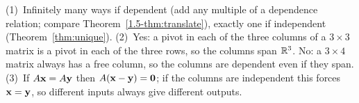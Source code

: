 \documentclass[11pt]{article}
\begin{document}
\begin{description}[leftmargin=0pt,itemsep=5pt]
  \item[Before the next section.] (1)~Infinitely many ways if dependent (add any multiple of a dependence relation; compare Theorem~\ref{1.5-thm:translate}), exactly one if independent (Theorem~\ref{thm:unique}). (2)~Yes: a pivot in each of the three columns of a $3\times3$ matrix is a pivot in each of the three rows, so the columns span $\mathbb{R}^3$. No: a $3\times4$ matrix always has a free column, so the columns are dependent even if they span. (3)~If $A\mathbf{x}=A\mathbf{y}$ then $A(\mathbf{x}-\mathbf{y})=\mathbf{0}$; if the columns are independent this forces $\mathbf{x}=\mathbf{y}$, so different inputs always give different outputs.
\end{description}
\end{document}
